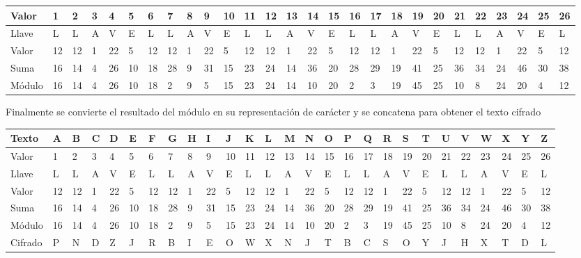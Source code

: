 \documentclass[10pt]{article}
\begin{document}
\begin{enumerate}
\begin{table}[h]
\begin{adjustbox}{width=1\columnwidth,center}
\begin{tabular}{|l|l|l|l|l|l|l|l|l|l|l|l|l|l|l|l|l|l|l|l|l|l|l|l|l|l|l|}
        Valor   & 1  & 2  & 3 & 4  & 5  & 6  & 7  & 8 & 9  & 10 & 11 & 12 & 13 & 14 & 15 & 16 & 17 & 18 & 19 & 20 & 21 & 22 & 23 & 24 & 25 & 26 \\ \hline 
        Llave   & L  & L  & A & V  & E  & L  & L  & A & V  & E  & L  & L  & A  & V  & E  & L  & L  & A  & V  & E  & L  & L  & A  & V  & E  & L  \\ \hline
        Valor   & 12 & 12 & 1 & 22 & 5  & 12 & 12 & 1 & 22 & 5  & 12 & 12 & 1  & 22 & 5  & 12 & 12 & 1  & 22 & 5  & 12 & 12 & 1  & 22 & 5  & 12 \\ \hline
        Suma    & 16 & 14 & 4 & 26 & 10 & 18 & 28 & 9 & 31 & 15 & 23 & 24 & 14 & 36 & 20 & 28 & 29 & 19 & 41 & 25 & 36 & 34 & 24 & 46 & 30 & 38 \\ \hline
        Módulo  & 16 & 14 & 4 & 26 & 10 & 18 & 2  & 9 & 5  & 15 & 23 & 24 & 14 & 10 & 20 & 2  & 3  & 19 & 45 & 25 & 10 & 8  & 24 & 20 & 4  & 12 \\ \hline
      \end{tabular}
    \end{adjustbox}
  \end{table} 
\end{enumerate}
\item Finalmente se convierte el resultado del módulo en su representación de carácter y se concatena para obtener el texto cifrado
\begin{table}[h]
  \begin{adjustbox}{width=1\columnwidth,center}
    \begin{tabular}{|l|l|l|l|l|l|l|l|l|l|l|l|l|l|l|l|l|l|l|l|l|l|l|l|l|l|l|}
      \hline
      Texto   & A  & B  & C & D  & E  & F  & G  & H & I  & J  & K  & L  & M  & N  & O  & P  & Q  & R  & S  & T  & U  & V  & W  & X  & Y  & Z  \\ \hline
      Valor   & 1  & 2  & 3 & 4  & 5  & 6  & 7  & 8 & 9  & 10 & 11 & 12 & 13 & 14 & 15 & 16 & 17 & 18 & 19 & 20 & 21 & 22 & 23 & 24 & 25 & 26 \\ \hline 
      Llave   & L  & L  & A & V  & E  & L  & L  & A & V  & E  & L  & L  & A  & V  & E  & L  & L  & A  & V  & E  & L  & L  & A  & V  & E  & L  \\ \hline
      Valor   & 12 & 12 & 1 & 22 & 5  & 12 & 12 & 1 & 22 & 5  & 12 & 12 & 1  & 22 & 5  & 12 & 12 & 1  & 22 & 5  & 12 & 12 & 1  & 22 & 5  & 12 \\ \hline
      Suma    & 16 & 14 & 4 & 26 & 10 & 18 & 28 & 9 & 31 & 15 & 23 & 24 & 14 & 36 & 20 & 28 & 29 & 19 & 41 & 25 & 36 & 34 & 24 & 46 & 30 & 38 \\ \hline
      Módulo  & 16 & 14 & 4 & 26 & 10 & 18 & 2  & 9 & 5  & 15 & 23 & 24 & 14 & 10 & 20 & 2  & 3  & 19 & 45 & 25 & 10 & 8  & 24 & 20 & 4  & 12 \\ \hline
      Cifrado & P  & N  & D & Z  & J  & R  & B  & I & E  & O  & W  & X  & N  & J  & T  & B  & C  & S  & O  & Y  & J  & H  & X  & T  & D  & L  \\ \hline
    \end{tabular}
  \end{adjustbox}
\end{table} 
\end{document}
